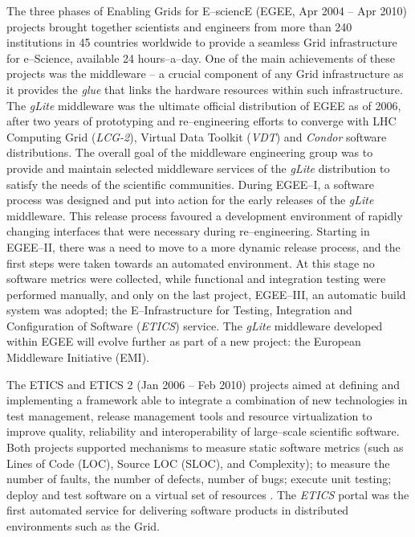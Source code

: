 \documentclass[journal]{IEEEtran}
\begin{document}
The three phases of Enabling Grids for E--sciencE (EGEE, Apr 2004 -- Apr 2010) \cite{cordis:egee, cordis:egee2, cordis:egee3} projects brought together scientists and engineers from more than 240 institutions in 45 countries worldwide to provide a seamless Grid infrastructure for e--Science, available 24 hours--a--day. One of the main achievements of these projects was the middleware -- a crucial component of any Grid infrastructure as it provides the {\sl glue} that links the hardware resources within such infrastructure. The {\sl gLite} middleware \cite{glite} was the ultimate official distribution of EGEE as of 2006, after two years of prototyping and re--engineering efforts to converge with LHC Computing Grid ({\sl LCG-2}), Virtual Data Toolkit ({\sl VDT}) and {\sl Condor} \cite{condor} software distributions. The overall goal of the middleware engineering group was to provide and maintain selected middleware services of the {\sl gLite} distribution to satisfy the needs of the scientific communities. During EGEE--I, a software process was designed and put into action for the early releases of the {\sl gLite} middleware. This release process favoured a development environment of rapidly changing interfaces that were necessary during re--engineering. Starting in EGEE--II, there was a need to move to a more dynamic release process, and the first steps were taken towards an automated environment. At this stage  no software metrics were collected, while functional and integration testing were performed manually, and only on the last project, EGEE--III, an automatic build system was adopted; the E--Infrastructure for Testing, Integration and Configuration of Software ({\sl ETICS}) service. The {\sl gLite} middleware developed within EGEE will evolve further as part of a new project: the European Middleware Initiative (EMI).

The ETICS \cite{cordis:etics} and ETICS 2 \cite{cordis:etics2} (Jan 2006 -- Feb 2010) projects aimed at defining and implementing a framework able to integrate a combination of new technologies in test management, release management tools and resource virtualization to improve quality, reliability and interoperability of large--scale scientific software. Both projects supported mechanisms to measure static software metrics (such as Lines of Code (LOC), Source LOC (SLOC), and Complexity); to measure the number of faults, the number of defects, number of bugs; execute unit testing; deploy and test software on a virtual set of resources \cite{etics}. The {\sl ETICS} portal was the first automated service for delivering software products in distributed environments such as the Grid.
\end{document}
